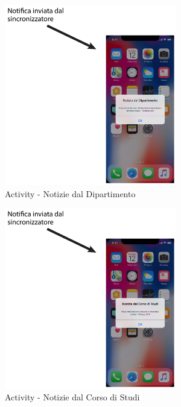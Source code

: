 \begin{figure}
	\centering
	\includegraphics[width=0.67\textwidth]{imgs/gruppo2/activity-notifiche-notizie-dipartimento}
	\caption{Activity - Notizie dal Dipartimento}
	\label{fig:activity-notifiche-notizie-dipartimento}
\end{figure}

\begin{figure}
	\centering
	\includegraphics[width=0.67\textwidth]{imgs/gruppo2/activity-notifiche-notizie-corso-di-studi}
	\caption{Activity - Notizie dal Corso di Studi}
	\label{fig:activity-notifiche-notizie-corso-di-studi}
\end{figure}

\clearpage